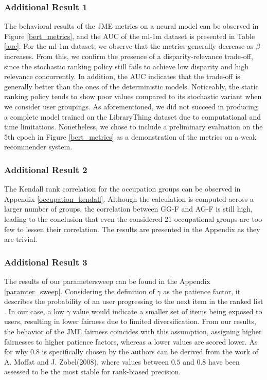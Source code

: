 \subsubsection{Additional Result 1}
The behavioral results of the JME metrics on a neural model can be observed in Figure \ref{bert_metrics}, and the AUC of the ml-1m dataset is presented in Table \ref{auc}. For the ml-1m dataset, we observe that the metrics generally decrease as $\beta$ increases. From this, we confirm the presence of a disparity-relevance trade-off, since the stochastic ranking policy still fails to achieve low disparity and high relevance concurrently. In addition, the AUC indicates that the trade-off is generally better than the ones of the deterministic models. Noticeably, the static ranking policy tends to show poor values compared to its stochastic variant when we consider user groupings. As aforementioned, we did not succeed in producing a complete model trained on the LibraryThing dataset due to computational and time limitations. Nonetheless, we chose to include a preliminary evaluation on the 5th epoch in Figure \ref{bert_metrics} as a demonstration of the metrics on a weak recommender system.

\subsubsection{Additional Result 2}
The Kendall rank correlation for the occupation groups can be observed in Appendix \ref{occupation_kendall}. Although the calculation is computed across a larger number of groups, the correlation between GG-F and AG-F is still high, leading to the conclusion that even the considered 21 occupational groups are too few to lessen their correlation. The results are presented in the Appendix as they are trivial. 

\subsubsection{Additional Result 3}
The results of our parametersweep can be found in the Appendix \ref{paramter_sweep}. Considering the definition of $\gamma$ as the patience factor, it describes the probability of an user progressing to the next item in the ranked list \cite{Moffat2008}. In our case, a low $\gamma$ value would indicate a smaller set of items being exposed to users, resulting in lower fairness due to limited diversification. From our results, the behavior of the JME fairness coincides with this assumption, assigning higher fairnesses to higher patience factors, whereas a lower values are scored lower. As for why $0.8$ is specifically chosen by the authors can be derived from the work of A. Moffat and J. Zobel(2008)\cite{Moffat2008}, where values between $0.5$ and $0.8$ have been assessed to be the most stable for rank-biased precision. 

